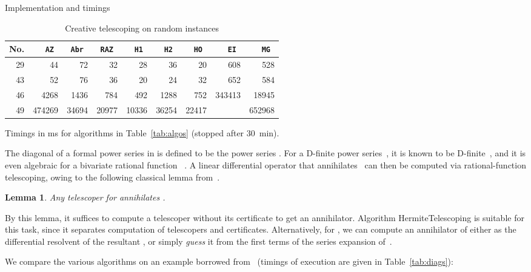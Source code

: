 \documentclass{sig-alt-full}
\newtheorem{lemma}{Lemma}
\begin{document}
\begin{section}{Implementation and timings}
\begin{table}
\begin{scriptsize}
\begin{center}
\begin{tabular}{r|rrrrrrrr}
No.& \tt AZ & \tt Abr & \tt RAZ & \tt H1 & \tt H2 & \tt HO & \tt EI & \tt MG \\
\hline
29 & 44 & 72 & 32 & 28 & 36 & 20 & 608 & 528 \\
43 & 52 & 76 & 36 & 20 & 24 & 32 & 652 & 584 \\
46 & 4268 & 1436 & 784 & 492 & 1288 & 752 & 343413 & 18945 \\
49 & 474269 & 34694 & 20977 & 10336 & 36254 & 22417 &  & 652968
\end{tabular}
\end{center}
\end{scriptsize}
\vskip-12pt
\caption{Creative telescoping on random instances}\label{tab:random}
\begin{small}
Timings in ms for algorithms in Table~\ref{tab:algos} (stopped after 30~min).
\end{small}
\vskip-10pt
\end{table}


\smallskip{}
The diagonal of a formal power series  in  is defined to be the power series .
For a D-finite power series~, it is known to be
D-finite~\cite{Lipshitz1988}, and it is even algebraic
for a bivariate rational function ~\cite[\S\,6.3]{Stanley1999}.
A linear differential operator  that
annihilates~ can then be computed via rational-function
telescoping, owing to the following classical lemma from~\cite{Lipshitz1988}.

\vspace{-0.2cm}
\begin{lemma}
Any telescoper for  annihilates .
\end{lemma}
By this lemma, it suffices to compute a telescoper without its certificate to get an annihilator.
Algorithm \textsf{HermiteTelescoping} is suitable for
this task, since it separates computation of telescopers and
certificates.
Alternatively, for , we can compute an annihilator of
 either as the differential resolvent of the resultant
, or simply \emph{guess\/} it from the
first terms of the series expansion of~.

We compare the various algorithms
on an example borrowed from~\cite{Flaxman-2004-SMM}
(timings of execution are given in Table~\ref{tab:diags}):




\end{section}
\end{document}
